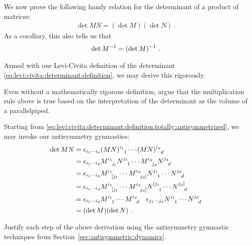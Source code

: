 \documentclass[12pt, oneside]{report}    %
\newenvironment{wide}{\begin{adjustwidth}{0cm}{-6.25cm}}{\end{adjustwidth}}
\begin{document}
We now prove the following handy relation for the determinant of a product of matrices:
\begin{align}
    \det MN = (\det M)(\det N) \ .
    \label{eq:det:product:rule}
\end{align}
As a corollary, this also tells us that
\begin{align}
    \det M^{-1} = (\det M)^{-1} \ .
\end{align}

Armed with our Levi-Civita definition of the determinant \eqref{eq:levi:civita:determinant:definition}, we may derive this rigorously.
\begin{exercise}
Even without a mathematically rigorous definition, argue that the multiplication rule above is true based on the interpretation of the determinant as the volume of a parallelpiped. 
\end{exercise}
\begin{wide}
Starting from \eqref{eq:levi:civita:determinant:definition:totally:antisymmetrized}, we may invoke our antisymmetry gynmastics:
\begin{align}
    \det MN &= 
    \epsilon_{i_1 \cdots i_d}
    (MN)\aij{i_1}{1}\cdots (MN)\aij{i_d}{d} 
    \\
    &= 
    \epsilon_{i_1 \cdots i_d}
    M\aij{i_1}{j_1}N\aij{j_1}{1}
    \cdots 
    M\aij{i_d}{j_d}N\aij{j_d}{d}
    \\
    &= 
    \epsilon_{i_1 \cdots i_d}
    M\aij{i_1}{[j_1}
    \cdots 
    M\aij{i_d}{j_d]}
    N\aij{j_1}{1}
    \cdots
    N\aij{j_d}{d}
    \\
    &= 
    \epsilon_{i_1 \cdots i_d}
    M\aij{i_1}{[j_1}
    \cdots 
    M\aij{i_d}{j_d]}
    N\aij{[j_1}{1}
    \cdots
    N\aij{j_d]}{d}
    \\
    &= 
    \epsilon_{i_1 \cdots i_d}
    M\aij{i_1}{1}
    \cdots 
    M\aij{i_d}{d}\quad
    \epsilon_{j_1 \cdots j_d}
    N\aij{j_1}{1}
    \cdots
    N\aij{j_d}{d}
    \\
    &= 
    (\det M)
    (\det N)
    \ .
\end{align}
\end{wide}
\begin{exercise}
Justify each step of the above derivation using the antisymmetry gymnastic techniques from Section~\ref{sec:antisymmetric:dynamics}.
\end{exercise}
\end{document}
